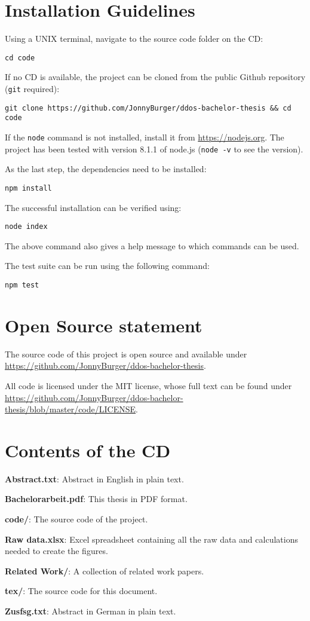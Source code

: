 \appendix

\chapter{Installation Guidelines}

Using a UNIX terminal, navigate to the source code folder on the CD:

\texttt{cd code}

If no CD is available, the project can be cloned from the public Github repository (\texttt{git} required):

\texttt{git clone https://github.com/JonnyBurger/ddos-bachelor-thesis \&\& cd code}

If the  \texttt{node} command is not installed, install it from \url{https://nodejs.org}. The project has been tested with version 8.1.1 of node.js (\texttt{node -v} to see the version).

As the last step, the dependencies need to be installed:

\texttt{npm install}

The successful installation can be verified using:

\texttt{node index}

The above command also gives a help message to which commands can be used.

The test suite can be run using the following command:

\texttt{npm test}

\chapter{Open Source statement}

The source code of this project is open source and available under \url{https://github.com/JonnyBurger/ddos-bachelor-thesis}.

All code is licensed under the MIT license, whose full text can be found under \url{https://github.com/JonnyBurger/ddos-bachelor-thesis/blob/master/code/LICENSE}.

\chapter{Contents of the CD}


\textbf{Abstract.txt}: Abstract in English in plain text.

\textbf{Bachelorarbeit.pdf}: This thesis in PDF format.

\textbf{code/}: The source code of the project.

\textbf{Raw data.xlsx}: Excel spreadsheet containing all the raw data and calculations needed to create the figures.

\textbf{Related Work/}: A collection of related work papers.

\textbf{tex/}: The source code for this document.


\textbf{Zusfsg.txt}: Abstract in German in plain text.
